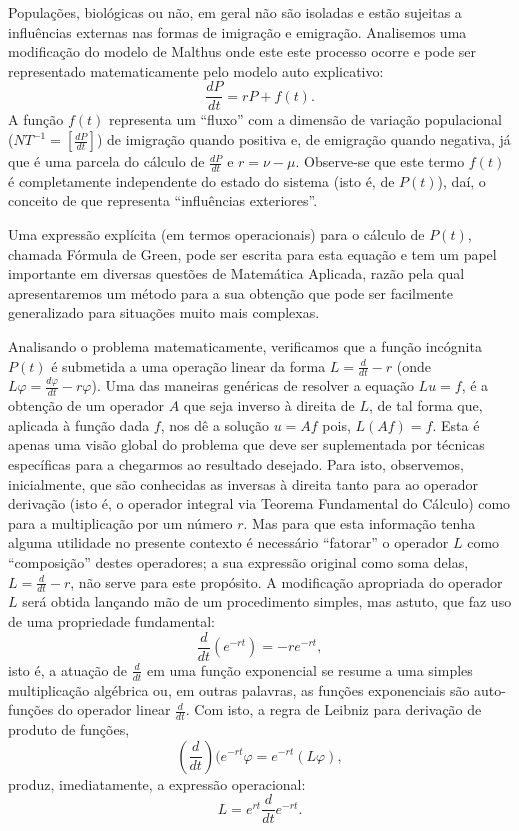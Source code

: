     Populações, biológicas ou não, em geral não são isoladas e estão sujeitas a influências externas nas formas de imigração e emigração. Analisemos uma modificação do modelo de Malthus onde este este processo ocorre e pode ser representado matematicamente pelo modelo auto explicativo:
    \[\dfrac{dP}{dt} = rP+f(t).\]
    A função \(f(t)\) representa um ``fluxo'' com a dimensão de variação populacional (\(NT^{-1} = \left[\frac{dP}{dt}\right]\)) de imigração quando positiva e, de emigração quando negativa, já que é uma parcela do cálculo de \(\frac{dP}{dt}\) e \(r = \nu-\mu\). Observe-se que este termo \(f(t)\) é completamente independente do estado do sistema (isto é, de \(P(t)\)), daí, o conceito de que representa ``influências exteriores''. 

    Uma expressão explícita (em termos operacionais) para o cálculo de \(P(t)\), chamada Fórmula de Green, pode ser escrita para esta equação e tem um papel importante em diversas questões de Matemática Aplicada, razão pela qual apresentaremos um método para a sua obtenção que pode ser facilmente generalizado para situações muito mais complexas.

    Analisando o problema matematicamente, verificamos que a função incógnita \(P(t)\) é submetida a uma operação linear da forma \(L = \frac{d}{dt}-r\) (onde \(L\varphi = \frac{d\varphi}{dt}-r\varphi\)). Uma das maneiras genéricas de resolver a equação \(Lu = f\), é a obtenção de um operador \(A\) que seja inverso à direita de \(L\), de tal forma que, aplicada à função dada \(f\), nos dê a solução \(u = Af\) pois, \(L(Af) = f\). Esta é apenas uma visão global do problema que deve ser suplementada por técnicas específicas para a chegarmos ao resultado desejado. Para isto, observemos, inicialmente, que são conhecidas as inversas à direita tanto para ao operador derivação (isto é, o operador integral via Teorema Fundamental do Cálculo) como para a multiplicação por um número \(r\). Mas para que esta informação tenha alguma utilidade no presente contexto é necessário ``fatorar'' o operador \(L\) como ``composição'' destes operadores; a sua expressão original como soma delas, \(L = \frac{d}{dt} - r\), não serve para este propósito. A modificação apropriada do operador \(L\) será obtida lançando mão de um procedimento simples, mas astuto, que faz uso de uma propriedade fundamental:
    \[\dfrac{d}{dt}(e^{-rt}) = -r e^{-rt},\]
    isto é, a atuação de \(\frac{d}{dt}\) em uma função exponencial se resume a uma simples multiplicação algébrica ou, em outras palavras, as funções exponenciais são auto-funções do operador linear \(\frac{d}{dt}\). Com isto, a regra de Leibniz para derivação de produto de funções,
    \[(\frac{d}{dt}) (e^{-rt}\varphi = e^{-rt}(L\varphi),\]
    produz, imediatamente, a expressão operacional:
    \[L = e^{rt} \frac{d}{dt} e^{-rt}.\]

